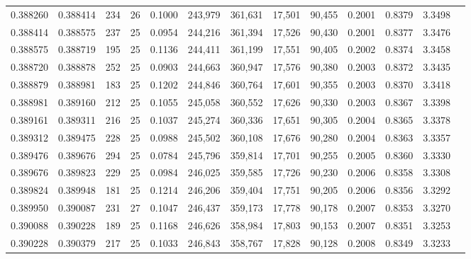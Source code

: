 \begin{tabular}{rrrrrrrrrrrrr}
0.388260 & 0.388414 &   234 &  26 &                                     0.1000 & 243,979 & 361,631 &  17,501 &  90,455 & 0.2001 & 0.8379 & 3.3498 \\
0.388414 & 0.388575 &   237 &  25 &                                     0.0954 & 244,216 & 361,394 &  17,526 &  90,430 & 0.2001 & 0.8377 & 3.3476 \\
0.388575 & 0.388719 &   195 &  25 &                                     0.1136 & 244,411 & 361,199 &  17,551 &  90,405 & 0.2002 & 0.8374 & 3.3458 \\
0.388720 & 0.388878 &   252 &  25 &                                     0.0903 & 244,663 & 360,947 &  17,576 &  90,380 & 0.2003 & 0.8372 & 3.3435 \\
0.388879 & 0.388981 &   183 &  25 &                                     0.1202 & 244,846 & 360,764 &  17,601 &  90,355 & 0.2003 & 0.8370 & 3.3418 \\
0.388981 & 0.389160 &   212 &  25 &                                     0.1055 & 245,058 & 360,552 &  17,626 &  90,330 & 0.2003 & 0.8367 & 3.3398 \\
0.389161 & 0.389311 &   216 &  25 &                                     0.1037 & 245,274 & 360,336 &  17,651 &  90,305 & 0.2004 & 0.8365 & 3.3378 \\
0.389312 & 0.389475 &   228 &  25 &                                     0.0988 & 245,502 & 360,108 &  17,676 &  90,280 & 0.2004 & 0.8363 & 3.3357 \\
0.389476 & 0.389676 &   294 &  25 &                                     0.0784 & 245,796 & 359,814 &  17,701 &  90,255 & 0.2005 & 0.8360 & 3.3330 \\
0.389676 & 0.389823 &   229 &  25 &                                     0.0984 & 246,025 & 359,585 &  17,726 &  90,230 & 0.2006 & 0.8358 & 3.3308 \\
0.389824 & 0.389948 &   181 &  25 &                                     0.1214 & 246,206 & 359,404 &  17,751 &  90,205 & 0.2006 & 0.8356 & 3.3292 \\
0.389950 & 0.390087 &   231 &  27 &                                     0.1047 & 246,437 & 359,173 &  17,778 &  90,178 & 0.2007 & 0.8353 & 3.3270 \\
0.390088 & 0.390228 &   189 &  25 &                                     0.1168 & 246,626 & 358,984 &  17,803 &  90,153 & 0.2007 & 0.8351 & 3.3253 \\
0.390228 & 0.390379 &   217 &  25 &                                     0.1033 & 246,843 & 358,767 &  17,828 &  90,128 & 0.2008 & 0.8349 & 3.3233 \\

\end{tabular}
